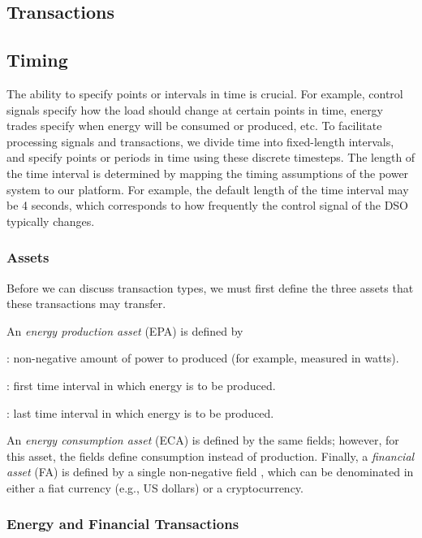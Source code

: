 \subsection{Transactions}

\subsection{Timing}

The ability to specify points or intervals in time is crucial.
For example, control signals specify how the load should change at certain points in time, energy trades specify when energy will be consumed or produced, etc.
To facilitate processing signals and transactions, we divide time into fixed-length intervals, and specify points or periods in time using these discrete timesteps.
The length of the time interval is determined by mapping the timing assumptions of the power system to our platform.
For example, the default length of the time interval may be 4 seconds, which corresponds to how frequently the control signal of the DSO typically changes.

\subsubsection{Assets}

Before we can discuss transaction types, we must first define the three assets that these transactions may transfer.

An \emph{energy production asset} (EPA) is defined by
\begin{compactitem}
\item {}: non-negative amount of power to produced (for example, measured in watts).
\item {}: first time interval in which energy is to be produced. 
\item {}: last time interval in which energy is to be produced.
\end{compactitem}
An \emph{energy consumption asset} (ECA) is defined by the same fields; however, for this asset, the fields define consumption instead of production.
Finally, a \emph{financial asset} (FA) is defined by a single non-negative field , which can be denominated in either a fiat currency (e.g., US dollars) or a cryptocurrency.

\subsubsection{Energy and Financial Transactions}

